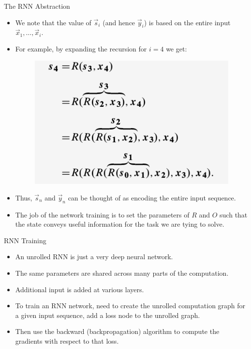 \documentclass[handout]{beamer}
\begin{document}
\begin{frame}{The RNN Abstraction}
\begin{scriptsize}
\begin{itemize}
\item We note that the value of $\vec{s}_i$  (and hence $\vec{y}_i$) is based on the entire input $\vec{x}_1,\dots, \vec{x}_i$.
\item For example, by expanding the recursion for $i = 4$ we get:
  \begin{figure}[h]
        	\includegraphics[scale = 0.35]{pics/RNN-recursion.png}
        \end{figure}
\item Thus, $\vec{s}_n$ and $\vec{y}_n$ can be thought of as encoding the entire input sequence.
\item The job of the network training is to set the parameters of $R$ and $O$ such that the state conveys useful information for the task we are tying to solve.

\end{itemize}
\end{scriptsize}
\end{frame}



\begin{frame}{RNN Training}
\begin{scriptsize}
\begin{itemize}
\item An unrolled RNN is just a very deep neural network.
\item The same parameters are shared across many parts of the computation.
\item Additional input is added at various layers.
\item To train an RNN network, need to create the unrolled computation graph for a given input sequence, add a loss node to the unrolled graph.
\item Then use the backward (backpropagation) algorithm to compute the gradients with respect to that loss.
\end{itemize}
\end{scriptsize}
\end{frame}
\end{document}
